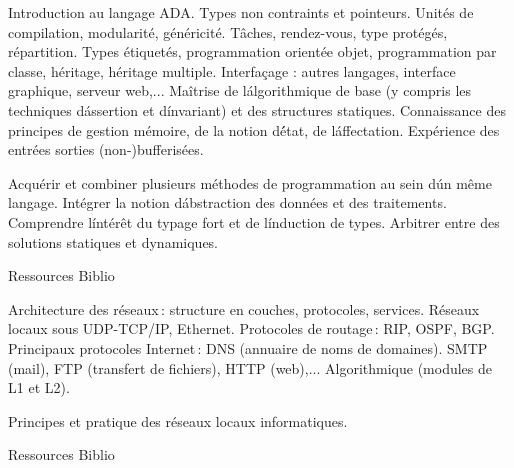 {
Introduction au langage ADA. Types non contraints et pointeurs.
Unités de compilation, modularité, généricité.
Tâches, rendez-vous, type protégés, répartition.
Types étiquetés, programmation orientée objet, programmation par classe, héritage, héritage multiple. Interfaçage : autres langages, interface graphique, serveur web,... 
} 
{Maîtrise de l\'algorithmique de base (y compris les techniques d\'assertion et d\'invariant) et des structures statiques. Connaissance des principes de gestion mémoire, de la notion d\'état, de l\'affectation. Expérience des entrées sorties (non-)bufferisées. } 
{\begin{itemize}
 \ObjItem Acquérir et combiner plusieurs méthodes de programmation au sein d\'un même langage. Intégrer la notion d\'abstraction des données et des traitements. 
 \ObjItem Comprendre l\'intérêt du typage fort et de l\'induction de types. Arbitrer entre des solutions statiques et dynamiques. 
\end{itemize} 
} 
{Ressources} 
{Biblio} 
 
\vfill

{
Architecture des réseaux\,: structure en couches, protocoles, services. Réseaux locaux sous UDP-TCP/IP, Ethernet. Protocoles de routage\,: RIP, OSPF, BGP. Principaux protocoles Internet\,: DNS (annuaire de noms de domaines). SMTP (mail), FTP (transfert de fichiers), HTTP (web),... 
} 
{Algorithmique (modules de L1 et L2).} 
{\begin{itemize}
 \ObjItem Principes et pratique des réseaux locaux informatiques.
\end{itemize} 
} 
{Ressources} 
{Biblio} 
 
